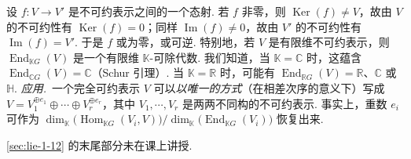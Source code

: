 \begin{numpara}[Schur 引理]\label{np:lie-1-12-8}
设 $f:V\longrightarrow V'$ 是不可约表示之间的一个态射. 若 $f$ 非零，则 $\operatorname{Ker}(f)\neq V$，故由 $V$ 的不可约性有 $\operatorname{Ker}(f)=0$；同样 $\operatorname{Im}(f)\neq 0$，故由 $V'$ 的不可约性有 $\operatorname{Im}(f)=V'$. 于是 $f$ 或为零，或可逆.
特别地，若 $V$ 是有限维不可约表示，则 $\operatorname{End}_{\mathbb K G}(V)$ 是一个有限维 $\mathbb K$-可除代数. 我们知道，当 $\mathbb K=\mathbb C$ 时，这蕴含 $\operatorname{End}_{\mathbb C G}(V)=\mathbb C$（Schur 引理）. 当 $\mathbb K=\mathbb R$ 时，可能有 $\operatorname{End}_{\mathbb R G}(V)=\mathbb R$、$\mathbb C$ 或 $\mathbb H$.
\emph{应用.}\ 一个完全可约表示 $V$ 可以\emph{以唯一的方式}（在相差次序的意义下）写成 $V=V_{1}^{\oplus e_{1}}\oplus\cdots\oplus V_{r}^{\oplus e_{r}}$，其中 $V_{1},\cdots,V_{r}$ 是两两不同构的不可约表示. 事实上，重数 $e_{i}$ 可作为 $\dim_{\mathbb K}\bigl(\operatorname{Hom}_{\mathbb K G}(V_{i},V)\bigr)/\dim_{\mathbb K}\bigl(\operatorname{End}_{\mathbb K G}(V_{i})\bigr)$ 恢复出来.
\end{numpara}
\ref{sec:lie-1-12} 的末尾部分未在课上讲授.

